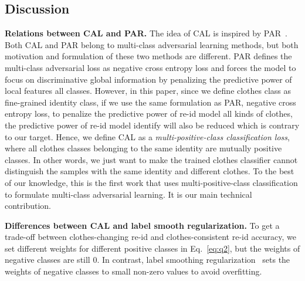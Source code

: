 \documentclass[10pt,twocolumn,letterpaper]{article}
\begin{document}
\subsection{Discussion}
\label{sec:discussion}
\noindent
\textbf{Relations between CAL and PAR.} 
The idea of CAL is inspired by PAR~\cite{Wang2019LearningRobust}. 
Both CAL and PAR belong to multi-class adversarial learning methods, but both motivation and formulation of these two methods are different.
PAR defines the multi-class adversarial loss as negative cross entropy loss and forces the model to focus on discriminative global information by penalizing the predictive power of local features \wrt all classes. 
However, in this paper, since we define clothes class as fine-grained identity class, if we use the same formulation as PAR, \ie negative cross entropy loss, to penalize the predictive power of re-id model \wrt all kinds of clothes, the predictive power of re-id model \wrt identify will also be reduced which is contrary to our target. 
Hence, we define CAL as a \emph{multi-positive-class classification loss}, where all clothes classes belonging to the same identity are mutually positive classes. 
In other words, we just want to make the trained clothes classifier cannot distinguish the samples with the same identity and different clothes.
To the best of our knowledge, this is the first work that uses multi-positive-class classification to formulate multi-class adversarial learning. 
It is our main technical contribution. 

\medskip
\noindent
\textbf{Differences between CAL and label smooth regularization.} 
To get a trade-off between clothes-changing re-id and clothes-consistent re-id accuracy, we set different weights for different positive classes in Eq.~\eqref{eq:q2}, but the weights of negative classes are still 0. In contrast, label smoothing regularization~\cite{Inceptionv2} sets the weights of negative classes to small non-zero values to avoid overfitting.
\end{document}
